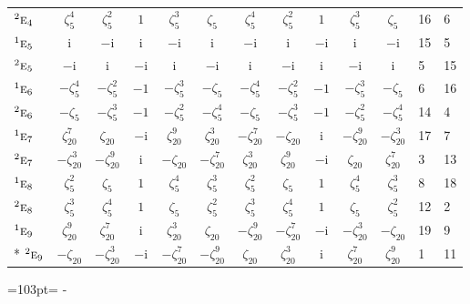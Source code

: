 \documentclass[10pt,a4paper]{article}
\newcommand{\needspace}[1]{\par\penalty-100\begingroup\dimen0=#1\relax\dimen2=\pagegoal
  \advance\dimen2-\pagetotal\ifdim\dimen0>\dimen2\relax\ifdim\dimen2>0pt\vfil\break\fi\fi
  \endgroup}
\numberwithin{equation}{section}
\newcommand{\irr}[1]{\text{\normalfont\scshape #1}}
\newcommand{\conjpair}[1]{{}^{#1}}
\newcommand{\iunit}{\mathrm{i}}
\newcommand{\rootunity}[1]{\zeta_{#1}}
\begin{document}
{\begin{longtable}{@{}lccccccccccll@{}}
$\conjpair{2}\irr{e}_{4}$ & $\rootunity{5}^{4}$ & $\rootunity{5}^{2}$ & $1$ & $\rootunity{5}^{3}$ & $\rootunity{5}$ & $\rootunity{5}^{4}$ & $\rootunity{5}^{2}$ & $1$ & $\rootunity{5}^{3}$ & $\rootunity{5}$ & 16 & 6\\
$\conjpair{1}\irr{e}_{5}$ & $\iunit{}$ & $-\iunit{}$ & $\iunit{}$ & $-\iunit{}$ & $\iunit{}$ & $-\iunit{}$ & $\iunit{}$ & $-\iunit{}$ & $\iunit{}$ & $-\iunit{}$ & 15 & 5\\
$\conjpair{2}\irr{e}_{5}$ & $-\iunit{}$ & $\iunit{}$ & $-\iunit{}$ & $\iunit{}$ & $-\iunit{}$ & $\iunit{}$ & $-\iunit{}$ & $\iunit{}$ & $-\iunit{}$ & $\iunit{}$ & 5 & 15\\
$\conjpair{1}\irr{e}_{6}$ & $-\rootunity{5}^{4}$ & $-\rootunity{5}^{2}$ & $-1$ & $-\rootunity{5}^{3}$ & $-\rootunity{5}$ & $-\rootunity{5}^{4}$ & $-\rootunity{5}^{2}$ & $-1$ & $-\rootunity{5}^{3}$ & $-\rootunity{5}$ & 6 & 16\\
$\conjpair{2}\irr{e}_{6}$ & $-\rootunity{5}$ & $-\rootunity{5}^{3}$ & $-1$ & $-\rootunity{5}^{2}$ & $-\rootunity{5}^{4}$ & $-\rootunity{5}$ & $-\rootunity{5}^{3}$ & $-1$ & $-\rootunity{5}^{2}$ & $-\rootunity{5}^{4}$ & 14 & 4\\
$\conjpair{1}\irr{e}_{7}$ & $\rootunity{20}^{7}$ & $\rootunity{20}$ & $-\iunit{}$ & $\rootunity{20}^{9}$ & $\rootunity{20}^{3}$ & $-\rootunity{20}^{7}$ & $-\rootunity{20}$ & $\iunit{}$ & $-\rootunity{20}^{9}$ & $-\rootunity{20}^{3}$ & 17 & 7\\
$\conjpair{2}\irr{e}_{7}$ & $-\rootunity{20}^{3}$ & $-\rootunity{20}^{9}$ & $\iunit{}$ & $-\rootunity{20}$ & $-\rootunity{20}^{7}$ & $\rootunity{20}^{3}$ & $\rootunity{20}^{9}$ & $-\iunit{}$ & $\rootunity{20}$ & $\rootunity{20}^{7}$ & 3 & 13\\
$\conjpair{1}\irr{e}_{8}$ & $\rootunity{5}^{2}$ & $\rootunity{5}$ & $1$ & $\rootunity{5}^{4}$ & $\rootunity{5}^{3}$ & $\rootunity{5}^{2}$ & $\rootunity{5}$ & $1$ & $\rootunity{5}^{4}$ & $\rootunity{5}^{3}$ & 8 & 18\\
$\conjpair{2}\irr{e}_{8}$ & $\rootunity{5}^{3}$ & $\rootunity{5}^{4}$ & $1$ & $\rootunity{5}$ & $\rootunity{5}^{2}$ & $\rootunity{5}^{3}$ & $\rootunity{5}^{4}$ & $1$ & $\rootunity{5}$ & $\rootunity{5}^{2}$ & 12 & 2\\
$\conjpair{1}\irr{e}_{9}$ & $\rootunity{20}^{9}$ & $\rootunity{20}^{7}$ & $\iunit{}$ & $\rootunity{20}^{3}$ & $\rootunity{20}$ & $-\rootunity{20}^{9}$ & $-\rootunity{20}^{7}$ & $-\iunit{}$ & $-\rootunity{20}^{3}$ & $-\rootunity{20}$ & 19 & 9\\*
$\conjpair{2}\irr{e}_{9}$ & $-\rootunity{20}$ & $-\rootunity{20}^{3}$ & $-\iunit{}$ & $-\rootunity{20}^{7}$ & $-\rootunity{20}^{9}$ & $\rootunity{20}$ & $\rootunity{20}^{3}$ & $\iunit{}$ & $\rootunity{20}^{7}$ & $\rootunity{20}^{9}$ & 1 & 11\\
\bottomrule\end{longtable}}
\needspace{103pt}
\end{document}
